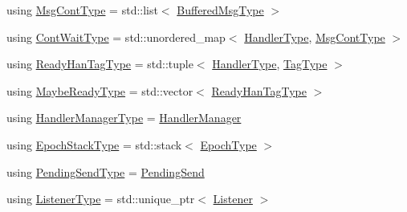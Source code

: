 \begin{DoxyCompactItemize}
using \hyperlink{structvt_1_1messaging_1_1_active_messenger_a18bbfbf9ecd82b33f6fc475b2e5290a5}{Msg\+Cont\+Type} = std\+::list$<$ \hyperlink{structvt_1_1messaging_1_1_active_messenger_a80a9cbda399d7bf035bfcecc761f4b02}{Buffered\+Msg\+Type} $>$
\item 
using \hyperlink{structvt_1_1messaging_1_1_active_messenger_a1c52f4ec0c93821191cb3e69dc7c8604}{Cont\+Wait\+Type} = std\+::unordered\+\_\+map$<$ \hyperlink{namespacevt_af64846b57dfcaf104da3ef6967917573}{Handler\+Type}, \hyperlink{structvt_1_1messaging_1_1_active_messenger_a18bbfbf9ecd82b33f6fc475b2e5290a5}{Msg\+Cont\+Type} $>$
\item 
using \hyperlink{structvt_1_1messaging_1_1_active_messenger_a98bb74aa4a561161dd7c7073dcd5f1d3}{Ready\+Han\+Tag\+Type} = std\+::tuple$<$ \hyperlink{namespacevt_af64846b57dfcaf104da3ef6967917573}{Handler\+Type}, \hyperlink{namespacevt_a84ab281dae04a52a4b243d6bf62d0e52}{Tag\+Type} $>$
\item 
using \hyperlink{structvt_1_1messaging_1_1_active_messenger_a745d5e8cad8c2f67d20479afacc6e134}{Maybe\+Ready\+Type} = std\+::vector$<$ \hyperlink{structvt_1_1messaging_1_1_active_messenger_a98bb74aa4a561161dd7c7073dcd5f1d3}{Ready\+Han\+Tag\+Type} $>$
\item 
using \hyperlink{structvt_1_1messaging_1_1_active_messenger_ac7e9165df6550ea333f8eb018a5a0e60}{Handler\+Manager\+Type} = \hyperlink{structvt_1_1_handler_manager}{Handler\+Manager}
\item 
using \hyperlink{structvt_1_1messaging_1_1_active_messenger_a746358029c37dabf2b4c8ad26642aee9}{Epoch\+Stack\+Type} = std\+::stack$<$ \hyperlink{namespacevt_a985a5adf291c34a3ca263b3378388236}{Epoch\+Type} $>$
\item 
using \hyperlink{structvt_1_1messaging_1_1_active_messenger_a3626a6ca76d8ad4ec7c3b47a2c70d3a8}{Pending\+Send\+Type} = \hyperlink{structvt_1_1messaging_1_1_pending_send}{Pending\+Send}
\item 
using \hyperlink{structvt_1_1messaging_1_1_active_messenger_a63878fd4ef1fbc505bd1313d32049ca9}{Listener\+Type} = std\+::unique\+\_\+ptr$<$ \hyperlink{structvt_1_1messaging_1_1_listener}{Listener} $>$
\end{DoxyCompactItemize}
